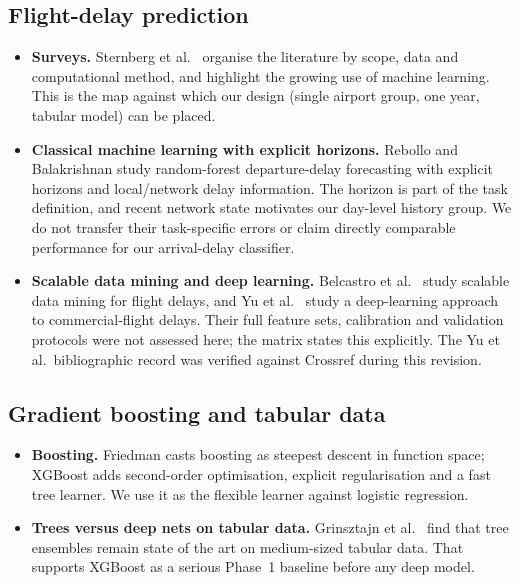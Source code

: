 \documentclass[conference]{IEEEtran}
\begin{document}
\subsection{Flight-delay prediction}
\begin{itemize}
\item \textbf{Surveys.} Sternberg et al.\ \cite{sternberg2017review} organise the literature by scope, data and computational method, and highlight the growing use of machine learning. This is the map against which our design (single airport group, one year, tabular model) can be placed.
\item \textbf{Classical machine learning with explicit horizons.} Rebollo and Balakrishnan \cite{rebollo2014} study random-forest departure-delay forecasting with explicit horizons and local/network delay information. The horizon is part of the task definition, and recent network state motivates our day-level history group. We do not transfer their task-specific errors or claim directly comparable performance for our arrival-delay classifier.
\item \textbf{Scalable data mining and deep learning.} Belcastro et al.\ \cite{belcastro2016} study scalable data mining for flight delays, and Yu et al.\ \cite{yu2019} study a deep-learning approach to commercial-flight delays. Their full feature sets, calibration and validation protocols were not assessed here; the matrix states this explicitly. The Yu et al.\ bibliographic record was verified against Crossref during this revision.
\end{itemize}

\subsection{Gradient boosting and tabular data}
\begin{itemize}
\item \textbf{Boosting.} Friedman \cite{friedman2001gbm} casts boosting as steepest descent in function space; XGBoost \cite{chen2016xgboost} adds second-order optimisation, explicit regularisation and a fast tree learner. We use it as the flexible learner against logistic regression.
\item \textbf{Trees versus deep nets on tabular data.} Grinsztajn et al.\ \cite{grinsztajn2022} find that tree ensembles remain state of the art on medium-sized tabular data. That supports XGBoost as a serious Phase~1 baseline before any deep model.
\end{itemize}
\end{document}
